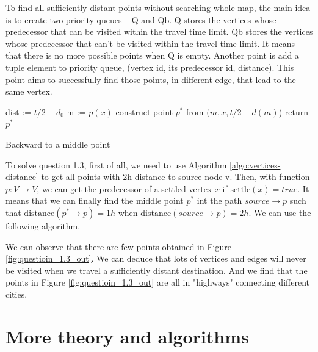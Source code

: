 \documentclass[titlepage,11pt,a4paper]{article}
\begin{document}
To find all sufficiently distant points without searching whole map, the main idea is to create two priority queues -- Q and Qb. Q stores the vertices whose predecessor that can be visited within the travel time limit. Qb stores the vertices whose predecessor that can't be visited within the travel time limit. It means that there is no more possible points when Q is empty. Another point is add a tuple element to priority queue, (vertex id, its predecessor id, distance). This point aims to successfully find those points, in different edge, that lead to the same vertex.


\begin{algorithm}[H]

 dist := $t/2 - d_0$\;
 m := $p(x)$\;
 construct point $p^*$ from $(m, x, t/2 - d(m)$)\;
 return $p^*$\;
 \caption{Backward to a middle point}
 \label{algo:Backward}
\end{algorithm}

To solve question 1.3, first of all, we need to use Algorithm \ref{algo:vertices-distance} to get all points with 2h distance to source node v. Then, with function $p: V \rightarrow V$, we can get the predecessor of a settled vertex $x$ if $\mathrm{settle}(x) = true$. It means that we can finally find the middle point $p^*$ int the path $source\rightarrow p$ such that $\mathrm{distance}(p^*\rightarrow p) = 1h$ when $\mathrm{distance}(source \rightarrow p) = 2h$. We can use the following algorithm.





We can observe that there are few points obtained in Figure \ref{fig:questioin_1.3_out}. We can deduce that lots of vertices and edges will never be visited when we travel a sufficiently distant destination. And we find that the points in Figure \ref{fig:questioin_1.3_out} are all in "highways" connecting different cities.

\section{More theory and algorithms}
\end{document}
